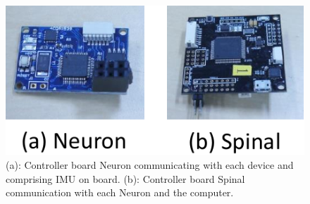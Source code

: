 \begin{figure}[t]
  \begin{center}
    \includegraphics[width=0.7\columnwidth]{figs/controller_board.pdf}
  \end{center}
  \caption{(a): Controller board Neuron communicating with each device and comprising IMU on board. (b): Controller board Spinal communication with each Neuron and the computer.\label{figure:controller_board}}
\end{figure}
